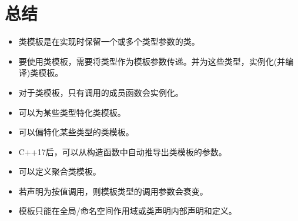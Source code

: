 \section{总结}

\begin{itemize}
\item 
类模板是在实现时保留一个或多个类型参数的类。

\item 
要使用类模板，需要将类型作为模板参数传递。并为这些类型，实例化(并编译)类模板。

\item 
对于类模板，只有调用的成员函数会实例化。

\item 
可以为某些类型特化类模板。

\item 
可以偏特化某些类型的类模板。

\item 
C++17后，可以从构造函数中自动推导出类模板的参数。

\item 
可以定义聚合类模板。

\item 
若声明为按值调用，则模板类型的调用参数会衰变。

\item 
模板只能在全局/命名空间作用域或类声明内部声明和定义。
\end{itemize}